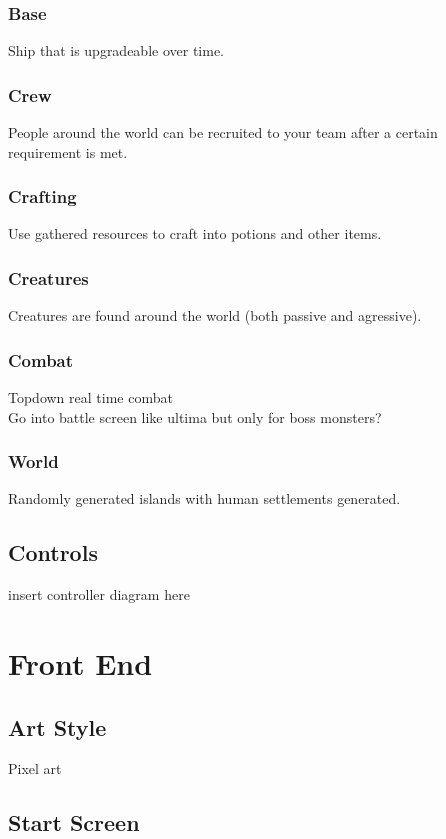 \documentclass[a4paper]{scrreprt}
\begin{document}
\subsection{Base}
Ship that is upgradeable over time.

\subsection{Crew}
People around the world can be recruited to your team after a certain requirement is met.

\subsection{Crafting}
Use gathered resources to craft into potions and other items.

\subsection{Creatures}
Creatures are found around the world (both passive and agressive).

\subsection{Combat}
Topdown real time combat\\
Go into battle screen like ultima but only for boss monsters?

\subsection{World}
Randomly generated islands with human settlements generated.

\section{Controls}
insert controller diagram here




\chapter{Front End}

\section{Art Style}
Pixel art

\section{Start Screen}
\end{document}
